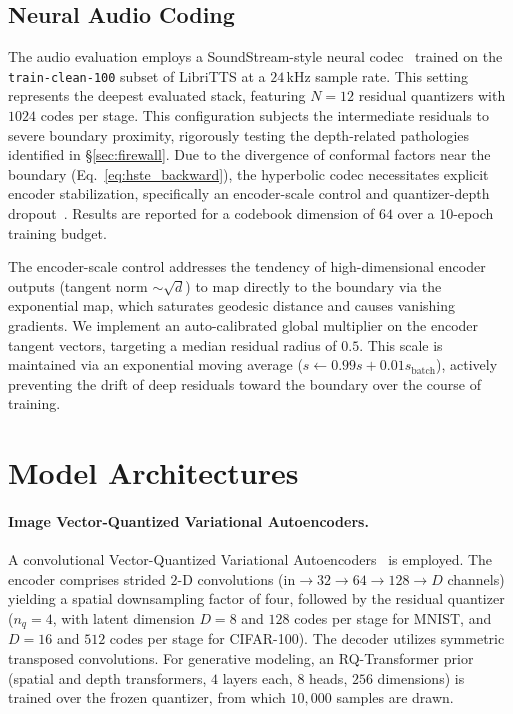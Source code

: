 \documentclass[12pt]{report}
\begin{document}
\subsection{Neural Audio Coding}
\label{sec:tasks_audio}
The audio evaluation employs a SoundStream-style neural codec~\cite{soundstream,encodec} trained on the \texttt{train-clean-100} subset of LibriTTS at a $24$\,kHz sample rate. This setting represents the deepest evaluated stack, featuring $N=12$ residual quantizers with $1024$ codes per stage. This configuration subjects the intermediate residuals to severe boundary proximity, rigorously testing the depth-related pathologies identified in \S\ref{sec:firewall}. Due to the divergence of conformal factors near the boundary (Eq.~\ref{eq:hste_backward}), the hyperbolic codec necessitates explicit encoder stabilization, specifically an encoder-scale control and quantizer-depth dropout~\cite{soundstream}. Results are reported for a codebook dimension of $64$ over a $10$-epoch training budget.

The encoder-scale control addresses the tendency of high-dimensional encoder outputs (tangent norm $\sim\!\sqrt{d}$) to map directly to the boundary via the exponential map, which saturates geodesic distance and causes vanishing gradients. We implement an auto-calibrated global multiplier on the encoder tangent vectors, targeting a median residual radius of $0.5$. This scale is maintained via an exponential moving average ($s \leftarrow 0.99s + 0.01s_{\text{batch}}$), actively preventing the drift of deep residuals toward the boundary over the course of training.

\section{Model Architectures}
\label{sec:models}

\paragraph{Image Vector-Quantized Variational Autoencoders.} A convolutional Vector-Quantized Variational Autoencoders~\cite{vqvae} is employed. The encoder comprises strided $2$-D convolutions ($\text{in}\to32\to64\to128\to D$ channels) yielding a spatial downsampling factor of four, followed by the residual quantizer ($n_q=4$, with latent dimension $D=8$ and $128$ codes per stage for MNIST, and $D=16$ and $512$ codes per stage for CIFAR-100). The decoder utilizes symmetric transposed convolutions. For generative modeling, an RQ-Transformer prior~\cite{lee2022rqvae} (spatial and depth transformers, $4$ layers each, $8$ heads, $256$ dimensions) is trained over the frozen quantizer, from which $10{,}000$ samples are drawn.
\end{document}
